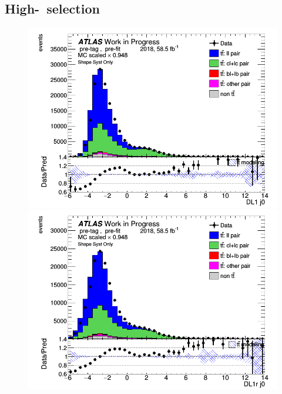 \documentclass[letterpaper,12pt]{article}
\begin{document}
\subsection{High-\pt\ selection}
\label{sec:appendix_highpT_selection}
\begin{figure}[H]
	\begin{minipage}[b]{.45\textwidth}
	\centering
	\includegraphics[width=1\textwidth]{Distribution_March_highpT/DataMC_J0_DL1.png}
	\end{minipage}\hfill
	\begin{minipage}[b]{.45\textwidth}
	\centering
	\includegraphics[width=1\textwidth]{Distribution_March_highpT/DataMC_J0_DL1r.png}
	\end{minipage}\hfill
	\begin{minipage}[b]{.45\textwidth}

\end{minipage}
\end{figure}
\end{document}
